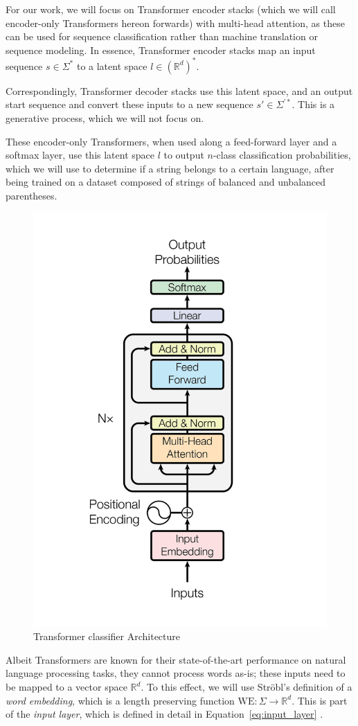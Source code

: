 For our work, we will focus on Transformer encoder stacks (which we will call encoder-only Transformers hereon forwards) with multi-head attention, as these can be used for sequence classification rather than machine translation or sequence modeling. In essence, Transformer encoder stacks map an input sequence $s \in \Sigma^*$ to a latent space $l \in (\mathbb{R}^{d})^*$.

Correspondingly, Transformer decoder stacks use this latent space, and an output start sequence and convert these inputs to a new sequence $s' \in \Sigma^{'*}$. This is a generative process, which we will not focus on.

These encoder-only Transformers, when used along a feed-forward layer and a softmax layer, use this latent space $l$ to output $n$-class classification probabilities, which we will use to determine if a string belongs to a certain language, after being trained on a dataset composed of strings of balanced and unbalanced parentheses.

\begin{figure}[h]
    \centering
    \includegraphics[width=0.6\linewidth]{docs/figs/transformer_classifier.png}
    \caption{Transformer classifier Architecture}
    \label{fig:transformer-classifier}
\end{figure}

Albeit Transformers are known for their state-of-the-art performance on natural language processing tasks, they cannot process words as-is; these inputs need to be mapped to a vector space $\mathbb{R}^d$. To this effect, we will use Ströbl's definition of a \emph{word embedding}, which is a length preserving function $\text{WE}: \Sigma \rightarrow \mathbb{R}^d$. This is part of the \emph{input layer}, which is defined in detail in Equation~\ref{eq:input_layer} \cite{strobl2024formal}. 

